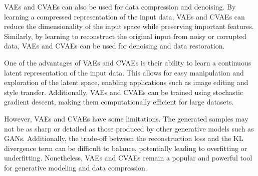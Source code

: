 VAEs and CVAEs can also be used for data compression and denoising. By learning a compressed representation of the input data, VAEs and CVAEs can reduce the dimensionality of the input space while preserving important features. Similarly, by learning to reconstruct the original input from noisy or corrupted data, VAEs and CVAEs can be used for denoising and data restoration.

One of the advantages of VAEs and CVAEs is their ability to learn a continuous latent representation of the input data. This allows for easy manipulation and exploration of the latent space, enabling applications such as image editing and style transfer. Additionally, VAEs and CVAEs can be trained using stochastic gradient descent, making them computationally efficient for large datasets.

However, VAEs and CVAEs have some limitations. The generated samples may not be as sharp or detailed as those produced by other generative models such as GANs. Additionally, the trade-off between the reconstruction loss and the KL divergence term can be difficult to balance, potentially leading to overfitting or underfitting. Nonetheless, VAEs and CVAEs remain a popular and powerful tool for generative modeling and data compression.

% 

% 

% 

